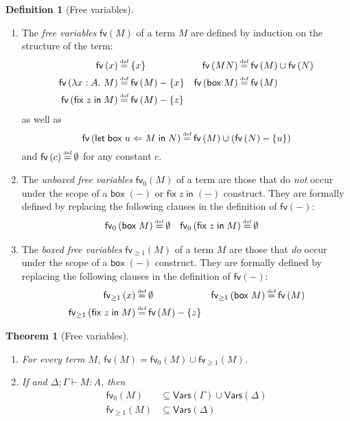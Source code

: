 \documentclass{myifcolog}
\newtheorem{thm}{Theorem}
\theoremstyle{definition}
\newtheorem{defn}{Definition}
\newcommand{\defeq}{\stackrel{\mathclap{\mbox{\tiny def}}}{=}}
\newcommand{\ctxt}[2]{#1\mathbin{;}#2}
\newcommand{\ibox}[1]{\mathsf{box\;}#1}
\newcommand{\letbox}[3]{\mathsf{let\;box\;} #1 \Leftarrow #2 \mathsf{\;in\;} #3}
\newcommand{\fixlob}[2]{\mathsf{fix\;} #1 \mathsf{\;in\;} #2}
\newcommand{\fv}[1]{\mathsf{fv}\left(#1\right)}
\newcommand{\ufv}[1]{\mathsf{fv}_0\left(#1\right)}
\newcommand{\bfv}[1]{\mathsf{fv}_{\geq 1}\left(#1\right)}
\newcommand{\vars}[1]{\mathsf{Vars}\left(#1\right)}
\begin{document}
\begin{defn}[Free variables] \hfill
  \begin{enumerate}
    \item The \emph{free variables} $\fv{M}$ of a term
    $M$ are defined by induction on the structure of the term:
    \begin{align*}
      \fv{x}  &\defeq \{x\} &
      \fv{MN} &\defeq \fv{M} \cup \fv{N} \\
      \fv{\lambda x : A.\ M} &\defeq \fv{M} - \{x\} &
      \fv{\ibox{M}} &\defeq \fv{M} \\
      \fv{\fixlob{z}{M}} &\defeq \fv{M} - \{z\}
    \end{align*}
    as well as \[
      \fv{\letbox{u}{M}{N}} \defeq \fv{M} \cup \left(\fv{N} - \{u\}\right)
    \] and $\fv{c} \defeq \emptyset$ for any constant $c$.

    \item The \emph{unboxed free variables} $\ufv{M}$ of a term
    are those that do \emph{not} occur under the scope of a
    $\ibox{(-)}$ or $\fixlob{z}{(-)}$ construct. They are formally
    defined by replacing the following clauses in the definition
    of $\fv{-}$:
    \begin{align*}
      \ufv{\ibox{M}} &\defeq \emptyset &
      \ufv{\fixlob{z}{M}} &\defeq \emptyset
    \end{align*}

    \item The \emph{boxed free variables} $\bfv{M}$ of a term $M$
    are those that \emph{do} occur under the scope of a
    $\ibox{(-)}$ construct. They are formally defined by replacing
    the following clauses in the definition of $\fv{-}$:
    \begin{align*}
      \bfv{x} &\defeq \emptyset &
      \bfv{\ibox{M}} &\defeq \fv{M} \\
      \bfv{\fixlob{z}{M}} &\defeq \fv{M} - \{z\}
    \end{align*}
  \end{enumerate}
\end{defn}

\begin{thm}[Free variables] \hfill
  \label{thm:freevar}
  \begin{enumerate}

    \item For every term $M$, $\fv{M} = \ufv{M} \cup \bfv{M}$.

    \item If and $\ctxt{\Delta}{\Gamma} \vdash M : A$, then
      \begin{align*}
	\ufv{M} &\subseteq \vars{\Gamma} \cup \vars{\Delta} \\
\bfv{M} &\subseteq \vars{\Delta}
     \end{align*}

  \end{enumerate}
\end{thm}
\end{document}
